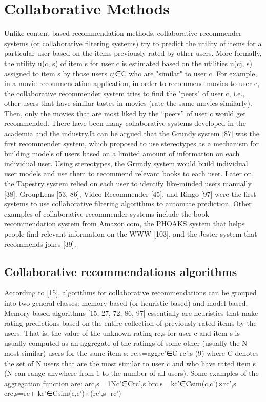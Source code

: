 \section{Collaborative Methods}
Unlike content-based recommendation methods, collaborative recommender systems (or collaborative filtering systems) try to predict the utility of items for a particular user based on the items previously rated by other users. More formally, the utility u(c, s) of item s for user c is estimated based on the utilities u(cj, s) assigned to item s by those users cj∈C who are "similar" to user c. For example, in a movie recommendation application, in order to recommend movies to user c, the collaborative recommender system tries to find the "peers" of user c, i.e., other users that have similar tastes in movies (rate the same movies similarly). Then, only the movies that are most liked by the “peers” of user c would get recommended.
There have been many collaborative systems developed in the academia and the industry.It can be argued that the Grundy system [87] was the first recommender system, which proposed to use stereotypes as a mechanism for building models of users based on a limited amount of information on each individual user. Using stereotypes, the Grundy system would build individual user models and use them to recommend relevant books to each user. Later on, the Tapestry system relied on each user to identify like-minded users manually [38]. GroupLens [53, 86], Video Recommender [45], and Ringo [97] were the first systems to use collaborative filtering algorithms to automate prediction. Other examples of collaborative recommender systems include the book recommendation system from Amazon.com, the PHOAKS system that helps people find relevant information on the WWW [103], and the Jester system that recommends jokes [39].

\subsection{Collaborative recommendations algorithms}
According to [15], algorithms for collaborative recommendations can be grouped into two general classes: memory-based (or heuristic-based) and model-based. Memory-based algorithms [15, 27, 72, 86, 97] essentially are heuristics that make rating predictions based on the entire collection of previously rated items by the users. That is, the value of the unknown rating rc,s for user c and item s is usually computed as an aggregate of the ratings of some other (usually the N most similar) users for the same item s:
rc,s=aggrc'∈C rc',s            (9)
where C denotes the set of N users that are the most similar to user c and who have rated item s (N can range anywhere from 1 to the number of all users). Some examples of the aggregation function are:
arc,s= 1Nc'∈Crc',s
brc,s= kc'∈Csim(c,c')×rc',s
crc,s=rc+ kc'∈Csim(c,c')×(rc',s- rc')

